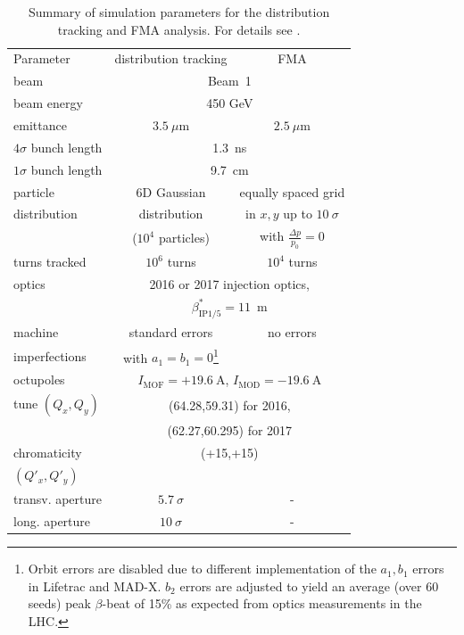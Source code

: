 \documentclass[%
 reprint,
 amsmath,amssymb,
 aps,
prstab,
]{revtex4-1}
\begin{document}
\begin{table}[h]
	\caption{\label{tab:sim_param}%
		Summary of simulation parameters for the distribution tracking and FMA analysis. For details see \cite{md_sim_hel_res_ex_fitterer,resexmd2017}.
	}
	\begin{ruledtabular}
		\begin{tabular}{lcc}
			Parameter & distribution tracking & FMA \\
			\colrule
			beam &\multicolumn{2}{c}{Beam~1} \\
			beam energy &\multicolumn{2}{c}{450 GeV} \\
			emittance & $3.5~\mu$m& $2.5~\mu$m\\
			$4\sigma$ bunch length & \multicolumn{2}{c}{1.3~ns}\\
			$1\sigma$ bunch length & \multicolumn{2}{c}{9.7~cm}\\
			particle & 6D Gaussian & equally spaced grid\\
			distribution &  distribution & in $x,y$ up to $10~\sigma$\\
			&  ($10^4$ particles) & with $\frac{\Delta p}{p_0}=0$\\
			turns tracked & $10^6$ turns & $10^4$ turns \\\hline
			optics & \multicolumn{2}{c}{2016 or 2017 injection optics,}\\
			& \multicolumn{2}{c}{$\beta_{\mathrm{IP1/5}}^*=11$~m}\\
			machine  & standard errors & no errors \\
			imperfections &with $a_1=b_1=0$\footnote{Orbit errors are disabled due to different implementation of the $a_1,b_1$ errors in Lifetrac and MAD-X. $b_2$ errors are adjusted to yield an average (over 60 seeds) peak $\beta$-beat of 15\% as expected from optics measurements in the LHC.} &  \\
			octupoles  & \multicolumn{2}{c}{$I_{\mathrm{MOF}}=+19.6~\mathrm{A}$, $I_{\mathrm{MOD}}=-19.6~\mathrm{A}$}\\
			tune $(Q_x,Q_y)$ & \multicolumn{2}{c}{(64.28,59.31) for 2016,}\\
			& \multicolumn{2}{c}{(62.27,60.295) for 2017}\\
			chromaticity & \multicolumn{2}{c}{(+15,+15)}\\
			$(Q'_x,Q'_y)$ & & \\\hline
			transv. aperture & $5.7~\sigma$ & - \\
			long. aperture & $10~\sigma$ & - \\
		\end{tabular}
	\end{ruledtabular}
\end{table}
\end{document}
